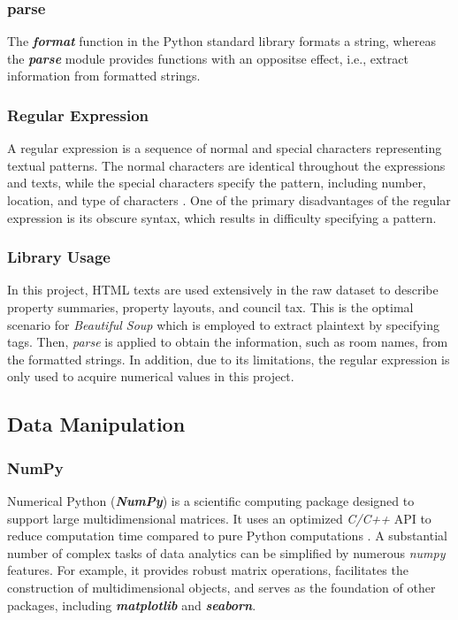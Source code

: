 \documentclass[12pt,twoside]{report}
\begin{document}
\subsubsection{parse}
The \textit{\textbf{format}} function in the Python standard library formats a string, whereas the \textit{\textbf{parse}} module provides functions with an oppositse effect, i.e., extract information from formatted strings.

\subsubsection{Regular Expression}
A regular expression is a sequence of normal and special characters representing textual patterns. The normal characters are identical throughout the expressions and texts, while the special characters specify the pattern, including number, location, and type of characters  \citep{RN14}. One of the primary disadvantages of the regular expression is its obscure syntax, which results in difficulty specifying a pattern. 

\subsubsection{Library Usage}
In this project, HTML texts are used extensively in the raw dataset to describe property summaries, property layouts, and council tax. This is the optimal scenario for \textit{Beautiful Soup} which is employed to extract plaintext by specifying tags. Then, \textit{parse} is applied to obtain the information, such as room names, from the formatted strings. In addition, due to its limitations, the regular expression is only used to acquire numerical values in this project. 


\subsection{Data Manipulation}
\subsubsection{NumPy}
Numerical Python (\textit{\textbf{NumPy}}) is a scientific computing package designed to support large multidimensional matrices. It uses an optimized \textit{C/C++} API to reduce computation time compared to pure Python computations \citep{RN6}. A substantial number of complex tasks of data analytics can be simplified by numerous \textit{numpy} features. For example, it provides robust matrix operations, facilitates the construction of multidimensional objects, and serves as the foundation of other packages, including \textbf{\textit{matplotlib}} and \textbf{\textit{seaborn}}.
\end{document}
